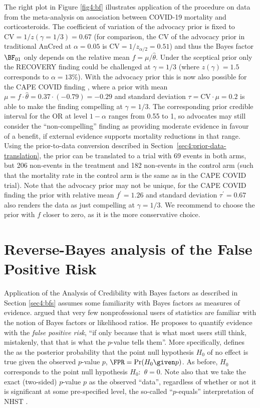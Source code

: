 The right plot in Figure \ref{fig4:bf} illustrates application of the procedure
on data from the meta-analysis on association between COVID-19 mortality and
corticosteroids. The coefficient of variation of the advocacy prior is fixed to
$\text{CV} = 1/z(\gamma=1/3) = 0.67$ (for comparison, the CV of the advocacy
prior in traditional AnCred at $\alpha = 0.05$ is
$\text{CV} = 1/z_{\alpha/2}= 0.51$) and thus the Bayes factor $\BF_{01}$ only
depends on the relative mean $f = \mu/\hat{\theta}$. Under the sceptical prior
only the RECOVERY finding could be challenged at $\gamma = 1/3$ (where
$z(\gamma)=1.5$ corresponds to $\alpha=13$\%). With the advocacy prior this is
now also possible for the CAPE COVID finding \citep{Dequin2020}, where a prior
with mean $\mu = f \cdot \hat{\theta} = 0.37 \cdot (-0.79) = -0.29$ and standard
deviation $\tau = \text{CV} \cdot \mu = 0.2$ is able to make the finding
compelling at $\gamma = 1/3$. The corresponding prior credible interval for the
OR at level $1-\alpha$ ranges from 0.55 to 1, so advocates may still consider
the ``non-compelling'' finding as providing moderate evidence in favour of a
benefit, if external evidence supports mortality reductions in that range. Using
the prior-to-data conversion described in
Section~\ref{sec4:prior-data-translation}, the prior can be translated to a
trial with 69 events in both arms, but 206 non-events in the treatment and 182
non-events in the control arm (such that the mortality rate in the control arm
is the same as in the CAPE COVID trial). Note that the advocacy prior may not be
unique, \eg{} for the CAPE COVID finding the prior with relative mean
$f^\prime = 1.26$ and standard deviation $\tau^\prime = 0.67$ also renders the
data as just compelling at $\gamma = 1/3$. We recommend to choose the prior with
$f$ closer to zero, as it is the more conservative choice.

\section{Reverse-Bayes analysis of the False Positive Risk}
\label{sec4:p.equals}

Application of the Analysis of Credibility with Bayes factors as described in
Section \ref{sec4:bfs} assumes some familiarity with Bayes factors as measures
of evidence. \citet{Colquhoun2019} argued that very few nonprofessional users of
statistics are familiar with the notion of Bayes factors or likelihood ratios.
He proposes to quantify evidence with the \emph{false positive risk}, ``if only
because that is what most users still think, mistakenly, that that is what the
$p$-value tells them''. More specifically, \citet{Colquhoun2019} defines the
\FPR{} as the posterior probability that the point null hypothesis $H_0$ of no
effect is true given the observed $p$-value $p$, \ie{} $\FPR = \Pr(H_0 \given p)$.
As before, $H_0$ corresponds to the point null hypothesis $H_0\colon$
$\theta = 0$. Note also that we take the exact (two-sided) $p$-value $p$ as the
observed ``data'', regardless of whether or not it is significant at some
pre-specified level, the so-called ``$p$-equals'' interpretation of NHST
\citep{Colquhoun2017}.


